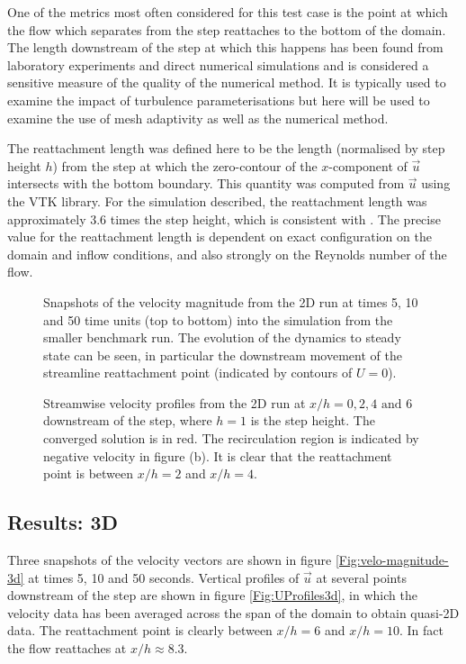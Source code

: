 One of the metrics most often considered for this test case is the point at which the
flow which separates from the step reattaches to the bottom of the domain.
The length downstream of the step at which this happens
has been found from laboratory experiments and direct numerical simulations and is considered a
sensitive measure of the quality of the numerical method. It is typically used to examine the impact
of turbulence parameterisations but here will be used to examine the use of mesh adaptivity
as well as the numerical method.

The reattachment length was defined here to be the length (normalised by step height $h$)
from the step at which the zero-contour of the $x$-component of $\vec{u}$ intersects with
the bottom boundary. This quantity was computed from $\vec{u}$
using the VTK library. For the simulation described, the reattachment
length was approximately 3.6 times the step height, which is consistent with \cite{armaly1983}.
The precise value for the reattachment length is dependent on exact configuration on the domain and inflow
conditions, and also strongly on the Reynolds number of the flow.

\begin{figure}
\centering
{}
\caption{Snapshots of the velocity magnitude from the 2D run at times 5, 10 and 50 time units
(top to bottom) into the simulation from the smaller benchmark run.
The evolution of the dynamics to steady state can be seen, in particular the downstream movement
of the streamline reattachment point (indicated by contours of $U=0$).}
\label{Fig:velo-magnitude-2d}
\end{figure}

\begin{figure}
\centering
{}
\caption{Streamwise velocity profiles from the 2D run at $x/h=0, 2, 4 \text{ and } 6$
downstream of the step, where $h=1$ is the step height. The converged solution is in red.
The recirculation region is indicated by negative velocity in figure (b).
It is clear that the reattachment point is between $x/h=2$ and $x/h=4$.}
\label{Fig:UProfiles2d}
\end{figure}


\subsection{Results: 3D}
Three snapshots of the velocity vectors are shown in figure \ref{Fig:velo-magnitude-3d}
at times 5, 10 and 50 seconds.
Vertical profiles of $\vec{u}$ at several points downstream of the step are shown in figure
\ref{Fig:UProfiles3d}, in which the velocity data has been averaged across the span of the domain
to obtain quasi-2D data. The reattachment point is clearly between $x/h=6$ and $x/h=10$.
In fact the flow reattaches at $x/h \approx 8.3$.


